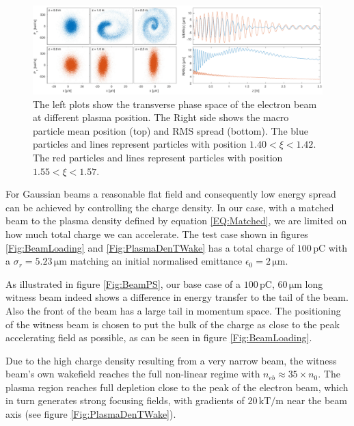\documentclass[aps,prstab,reprint,amsmath,amssymb,groupedaddress]{revtex4-1}
\newcommand{\unit}[1]{\,\mathrm{#1}}
\begin{document}
\begin{figure}[hbt]
    \includegraphics[width=\linewidth,trim={0mm 0mm 0mm 0mm},clip]{figures/beamFilamentationAll}
    \caption{\label{Fig:BeamFilament} The left plots show the transverse phase space of the electron beam at different
        plasma position. The Right side shows the macro particle mean position (top) and RMS spread (bottom). The blue
        particles and lines represent particles with position $1.40 < \xi < 1.42$. The red particles and lines
        represent particles with position $1.55 < \xi < 1.57$.}
\end{figure}

For Gaussian beams a reasonable flat field and consequently low energy spread can be achieved by controlling the charge
density. In our case, with a matched beam to the plasma density defined by equation \ref{EQ:Matched}, we are limited on
how much total charge we can accelerate. The test case shown in figures \ref{Fig:BeamLoading} and
\ref{Fig:PlasmaDenTWake} has a total charge of $100\unit{pC}$ with a $\sigma_{r}=5.23\unit{\mu m}$ matching an initial
normalised emittance $\epsilon_{0} = 2\unit{\mu m}$.

As illustrated in figure \ref{Fig:BeamPS}, our base case of a $100\unit{pC}$, $60\unit{\mu m}$ long witness beam indeed
shows a difference in energy transfer to the tail of the beam. Also the front of the beam has a large tail in momentum
space. The positioning of the witness beam is chosen to put the bulk of the charge as close to the peak accelerating
field as possible, as can be seen in figure \ref{Fig:BeamLoading}.

Due to the high charge density resulting from a very narrow beam, the witness beam's own wakefield reaches the full
non-linear regime with $n_{eb} \approx 35\times n_{0}$. The plasma region reaches full depletion close to the peak of
the electron beam, which in turn generates strong focusing fields, with gradients of $20\unit{kT/m}$ near the beam axis
(see figure \ref{Fig:PlasmaDenTWake}).
\end{document}
